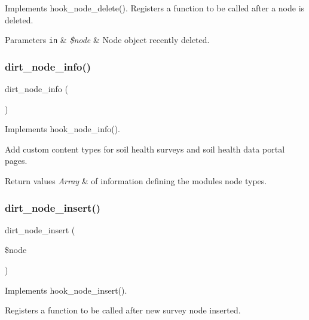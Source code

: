 Implements hook\+\_\+node\+\_\+delete(). Registers a function to be called after a node is deleted.


\begin{DoxyParams}[1]{Parameters}
\mbox{\tt in}  & {\em \$node} & Node object recently deleted. \\
\hline
\end{DoxyParams}
\mbox{\label{dirt_8module_a5680ba7e8861022daa46174274a09070}} 
\subsubsection{\texorpdfstring{dirt\+\_\+node\+\_\+info()}{dirt\_node\_info()}}
{\footnotesize\ttfamily dirt\+\_\+node\+\_\+info (\begin{DoxyParamCaption}{ }\end{DoxyParamCaption})}

Implements hook\+\_\+node\+\_\+info().

Add custom content types for soil health surveys and soil health data portal pages.


\begin{DoxyRetVals}{Return values}
{\em Array} & of information defining the module\textquotesingle{}s node types. \\
\hline
\end{DoxyRetVals}
\mbox{\label{dirt_8module_ad28f2e8a3a8121a540d1e6842e477ee6}} 
\subsubsection{\texorpdfstring{dirt\+\_\+node\+\_\+insert()}{dirt\_node\_insert()}}
{\footnotesize\ttfamily dirt\+\_\+node\+\_\+insert (\begin{DoxyParamCaption}\item[{}]{\$node }\end{DoxyParamCaption})}

Implements hook\+\_\+node\+\_\+insert().

Registers a function to be called after new survey node inserted.


